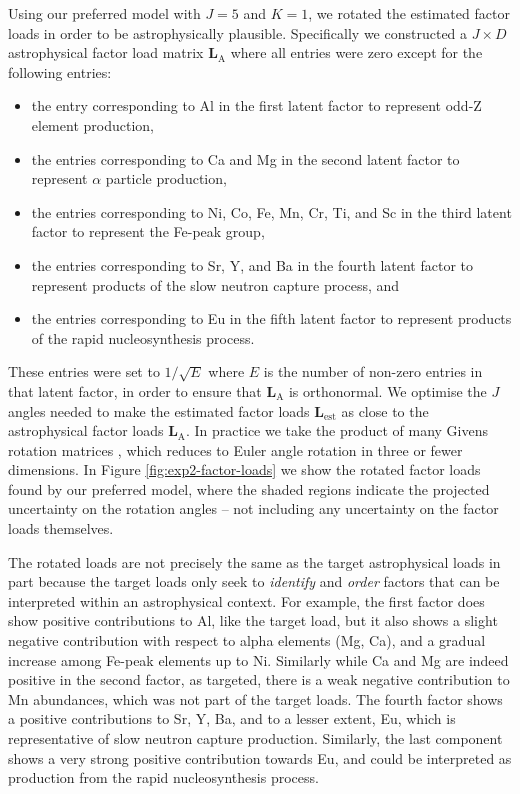 \documentclass[twocolumn]{aastex61}
\newcommand{\factorloads}{\textbf{L}}
\begin{document}
Using our preferred model with $J = 5$ and $K = 1$, we rotated the estimated
factor loads in order to be astrophysically plausible. Specifically we constructed
a $J \times D$ astrophysical factor load matrix $\factorloads_\textrm{A}$ where
all entries were zero except for the following entries:
\begin{itemize}
	\item the entry corresponding to Al in the first latent factor to represent
		  odd-Z element production,
	\item the entries corresponding to Ca and Mg in the second latent factor to
		  represent $\alpha$ particle production,
	\item the entries corresponding to Ni, Co, Fe, Mn, Cr, Ti, and Sc in the third
		  latent factor to represent the Fe-peak group,
	\item the entries corresponding to Sr, Y, and Ba in the fourth latent factor
		  to represent products of the slow neutron capture process, and
	\item the entries corresponding to Eu in the fifth latent factor to represent
		  products of the rapid nucleosynthesis process.
\end{itemize}
These entries were set to $1/\sqrt{E}$ where $E$ is the number of non-zero entries
in that latent factor, in order to ensure that $\factorloads_\textrm{A}$ is
orthonormal. We optimise the $J$ angles needed to make the estimated factor loads
$\factorloads_\textrm{est}$ as close to the astrophysical factor loads $\factorloads_\textrm{A}$.
In practice we take the product of many  Givens rotation matrices \citep{Givens},
which reduces to Euler angle rotation in three or fewer dimensions. In Figure
\ref{fig:exp2-factor-loads} we show the rotated factor loads found by our
preferred model, where the shaded regions indicate the projected uncertainty on
the rotation angles -- not including any uncertainty on the factor loads themselves.


The rotated loads are not precisely the same as the target astrophysical loads
in part because the target loads only seek to \emph{identify} and \emph{order}
factors that can be interpreted within an astrophysical context. For example,
the first factor does show positive contributions to Al, like the target load,
but it also shows a slight negative contribution with respect to alpha elements
(Mg, Ca), and a gradual increase among Fe-peak elements up to Ni. Similarly while
Ca and Mg are indeed positive in the second factor, as targeted, there is a
weak negative contribution to Mn abundances, which was not part of the target
loads. The fourth factor shows a positive contributions to Sr, Y, Ba, and to a
lesser extent, Eu, which is representative of slow neutron capture production.
Similarly, the last component shows a very strong positive contribution towards
Eu, and could be interpreted as production from the rapid nucleosynthesis process.
\end{document}
